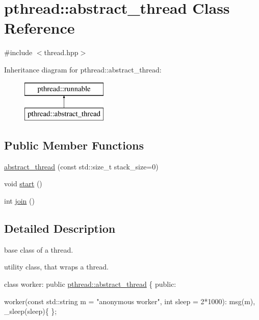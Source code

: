 \hypertarget{classpthread_1_1abstract__thread}{}\section{pthread\+:\+:abstract\+\_\+thread Class Reference}
\label{classpthread_1_1abstract__thread}


{\ttfamily \#include $<$thread.\+hpp$>$}

Inheritance diagram for pthread\+:\+:abstract\+\_\+thread\+:\begin{figure}[H]
\begin{center}
\leavevmode
\includegraphics[height=2.000000cm]{classpthread_1_1abstract__thread}
\end{center}
\end{figure}
\subsection*{Public Member Functions}
\begin{DoxyCompactItemize}
\item 
\hyperlink{classpthread_1_1abstract__thread_aef9de5da73087b69d00f71985a4cbdef}{abstract\+\_\+thread} (const std\+::size\+\_\+t stack\+\_\+size=0)
\item 
void \hyperlink{classpthread_1_1abstract__thread_ab121718028f3ca68d45db84d10ff2a3a}{start} ()
\item 
int \hyperlink{classpthread_1_1abstract__thread_aedac81bb9eb76ba92c49c48d797ea25b}{join} ()
\end{DoxyCompactItemize}


\subsection{Detailed Description}
base class of a thread.

utility class, that wraps a thread. 
\begin{DoxyPre}{\ttfamily 
class worker: public \hyperlink{classpthread_1_1abstract__thread}{pthread::abstract\_thread} \{
public:}\end{DoxyPre}



\begin{DoxyPre}{\ttfamily   worker(const std::string m = "anonymous worker", int sleep = 2*1000): msg(m), \_sleep(sleep)\{
  \};}\end{DoxyPre}



